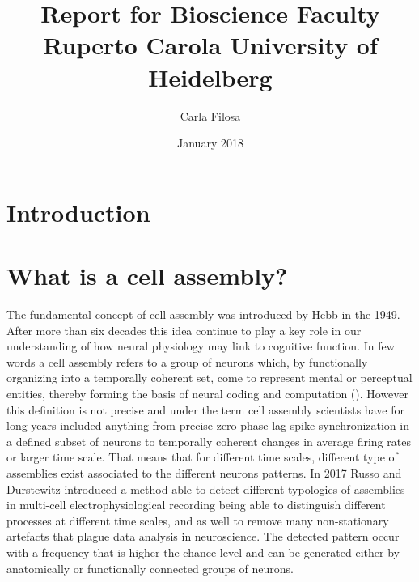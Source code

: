 \documentclass{article}
\title{Report for Bioscience Faculty\\Ruperto Carola University of Heidelberg}
\author{Carla Filosa}
\date{January 2018}
\begin{document}
\maketitle
\setcounter{tocdepth}{2} %

\tableofcontents %


\section{Introduction}
\section{What is a cell assembly?}
The fundamental concept of cell assembly was introduced by Hebb in the 1949. After more than six decades this idea continue to play a key role in our understanding of how neural physiology may link to cognitive function.
In few words a cell assembly refers to a group of neurons which, by functionally organizing into a temporally coherent set, come to represent mental or perceptual entities, thereby forming the basis  of neural coding and computation (\cite{Hebb}). However this definition is not precise and under the term cell assembly scientists have for long years included anything from precise zero-phase-lag spike synchronization in a defined subset of neurons to temporally coherent changes in average firing rates or larger time scale. That means that for different time scales, different type of assemblies exist associated to the different neurons patterns.
In 2017 Russo and Durstewitz introduced a method able to detect different typologies of assemblies in multi-cell electrophysiological recording being able to distinguish different processes at different time scales, and as well to remove many non-stationary artefacts that plague data analysis in neuroscience.
The detected pattern occur with a frequency that is higher the chance level and can be generated either by anatomically or functionally connected groups of neurons.
\end{document}
